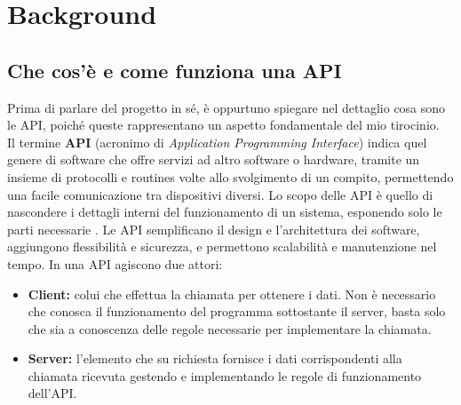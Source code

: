 \documentclass[italian, Lau, oneside, nodefaultfont, noexaminfo]{sapthesis}
\begin{document}


\bigskip
\chapter{Background}
\label{cap:cap03}

\section{Che cos'è e come funziona una API}
\label{sec:api}

Prima di parlare del progetto in s\'e,  \`e oppurtuno spiegare nel dettaglio cosa sono le API, poich\'e queste rappresentano un aspetto fondamentale del mio tirocinio.\\

Il termine \textbf{API} (acronimo di  \textit{Application Programming Interface}) indica quel genere di software che offre servizi ad altro software o hardware, tramite un insieme di protocolli e routines volte allo svolgimento di un compito, permettendo una facile comunicazione tra dispositivi diversi. Lo scopo delle API \`e  quello di nascondere i dettagli interni del funzionamento di un sistema, esponendo solo le parti necessarie \cite{ref:api-rh}. Le API semplificano il design e l’architettura dei software, aggiungono flessibilit\`a e sicurezza, e permettono scalabilit\`a e manutenzione nel tempo.
In una API agiscono due attori:
\begin{itemize}
    \item \textbf{Client:} colui che effettua la chiamata per ottenere i dati. Non \`e necessario che conosca il funzionamento del programma sottostante il server, basta solo che sia a conoscenza delle regole necessarie per implementare la chiamata.
    \item \textbf{Server:} l'elemento che su richiesta fornisce i dati corrispondenti alla chiamata ricevuta gestendo e implementando le regole di funzionamento dell’API.
\end{itemize}


\end{document}
